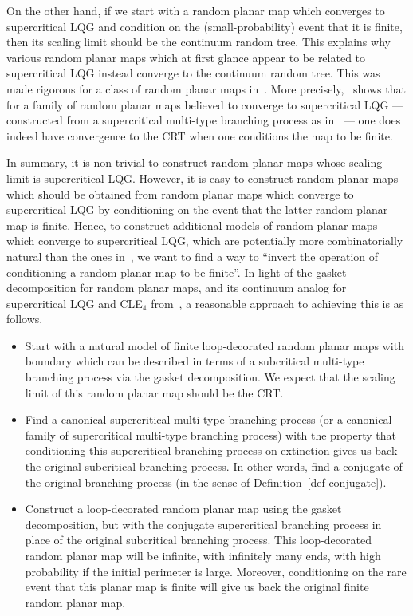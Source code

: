\documentclass[11pt]{article}
\theoremstyle{plain}
\theoremstyle{definition}
\numberwithin{equation}{section}
\begin{document}
On the other hand, if we start with a random planar map which converges to supercritical LQG and condition on the (small-probability) event that it is finite, then its scaling limit should be the continuum random tree. This explains why various random planar maps which at first glance appear to be related to supercritical LQG instead converge to the continuum random tree. This was made rigorous for a class of random planar maps in~\cite{bgs-supercritical-crt}. More precisely,~\cite[Theorem 1.4]{bgs-supercritical-crt} shows that for a family of random planar maps believed to converge to supercritical LQG --- constructed from a supercritical multi-type branching process as in~\cite{ag-supercritical-cle4} --- one does indeed have convergence to the CRT when one conditions the map to be finite.

In summary, it is non-trivial to construct random planar maps whose scaling limit is supercritical LQG. However, it is easy to construct random planar maps which should be obtained from random planar maps which converge to supercritical LQG by conditioning on the event that the latter random planar map is finite. Hence, to construct additional models of random planar maps which converge to supercritical LQG, which are potentially more combinatorially natural than the ones in~\cite{ag-supercritical-cle4,bgs-supercritical-crt}, we want to find a way to ``invert the operation of conditioning a random planar map to be finite''. In light of the gasket decomposition for random planar maps, and its continuum analog for supercritical LQG and CLE$_4$ from~\cite{ag-supercritical-cle4}, a reasonable approach to achieving this is as follows.
\begin{itemize}
\item Start with a natural model of finite loop-decorated random planar maps with boundary which can be described in terms of a subcritical multi-type branching process via the gasket decomposition. We expect that the scaling limit of this random planar map should be the CRT.
\item Find a canonical supercritical multi-type branching process (or a canonical family of supercritical multi-type branching process) with the property that conditioning this supercritical branching process on extinction gives us back the original subcritical branching process. In other words, find a conjugate of the original branching process (in the sense of Definition~\ref{def-conjugate}). 
\item Construct a loop-decorated random planar map using the gasket decomposition, but with the conjugate supercritical branching process in place of the original subcritical branching process. This loop-decorated random planar map will be infinite, with infinitely many ends, with high probability if the initial perimeter is large. Moreover, conditioning on the rare event that this planar map is finite will give us back the original finite random planar map.  
\end{itemize} 
\end{document}
